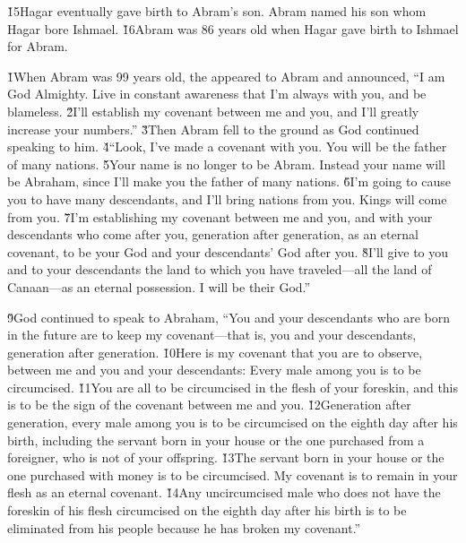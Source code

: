 \v{15}Hagar eventually gave birth to Abram's son. Abram named his son whom Hagar bore Ishmael. \v{16}Abram was 86 years old when Hagar gave birth to Ishmael for Abram.

\v{1}When Abram was 99 years old, the  appeared to Abram and announced, ``I am God Almighty. Live in constant awareness that I'm always with you, and be blameless. \v{2}I'll establish my covenant between me and you, and I'll greatly increase your numbers.'' \v{3}Then Abram fell to the ground as God continued speaking to him. \v{4}``Look, I've made a covenant with you. You will be the father of many nations. \v{5}Your name is no longer to be Abram. Instead your name will be Abraham, since I'll make you the father of many nations. \v{6}I'm going to cause you to have many descendants, and I'll bring nations from you. Kings will come from you. \v{7}I'm establishing my covenant between me and you, and with your descendants who come after you, generation after generation, as an eternal covenant, to be your God and your descendants' God after you. \v{8}I'll give to you and to your descendants the land to which you have traveled---all the land of Canaan---as an eternal possession. I will be their God.''

\v{9}God continued to speak to Abraham, ``You and your descendants who are born in the future are to keep my covenant---that is, you and your descendants, generation after generation. \v{10}Here is my covenant that you are to observe, between me and you and your descendants: Every male among you is to be circumcised. \v{11}You are all to be circumcised in the flesh of your foreskin, and this is to be the sign of the covenant between me and you. \v{12}Generation after generation, every male among you is to be circumcised on the eighth day after his birth, including the servant born in your house or the one purchased from a foreigner, who is not of your offspring. \v{13}The servant born in your house or the one purchased with money is to be circumcised. My covenant is to remain in your flesh as an eternal covenant. \v{14}Any uncircumcised male who does not have the foreskin of his flesh circumcised on the eighth day after his birth is to be eliminated from his people because he has broken my covenant.''

